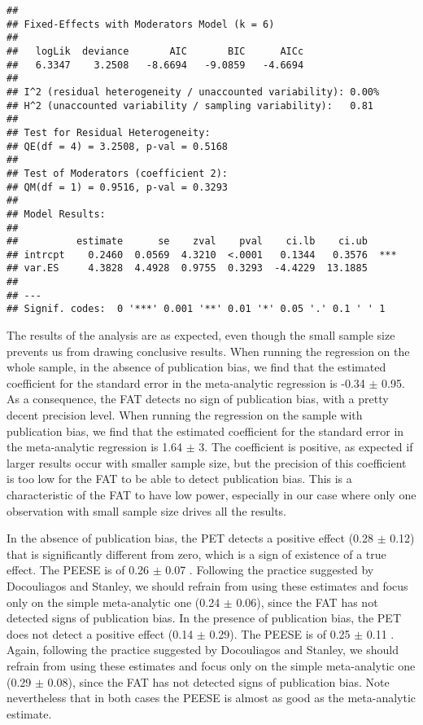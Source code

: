 \documentclass[
]{book}
\theoremstyle{definition}
\theoremstyle{definition}
\theoremstyle{definition}
\theoremstyle{definition}
\theoremstyle{remark}
\begin{document}
\begin{verbatim}
## 
## Fixed-Effects with Moderators Model (k = 6)
## 
##   logLik  deviance       AIC       BIC      AICc 
##   6.3347    3.2508   -8.6694   -9.0859   -4.6694   
## 
## I^2 (residual heterogeneity / unaccounted variability): 0.00%
## H^2 (unaccounted variability / sampling variability):   0.81
## 
## Test for Residual Heterogeneity:
## QE(df = 4) = 3.2508, p-val = 0.5168
## 
## Test of Moderators (coefficient 2):
## QM(df = 1) = 0.9516, p-val = 0.3293
## 
## Model Results:
## 
##          estimate      se    zval    pval    ci.lb    ci.ub 
## intrcpt    0.2460  0.0569  4.3210  <.0001   0.1344   0.3576  *** 
## var.ES     4.3828  4.4928  0.9755  0.3293  -4.4229  13.1885      
## 
## ---
## Signif. codes:  0 '***' 0.001 '**' 0.01 '*' 0.05 '.' 0.1 ' ' 1
\end{verbatim}

The results of the analysis are as expected, even though the small sample size prevents us from drawing conclusive results.
When running the regression on the whole sample, in the absence of publication bias, we find that the estimated coefficient for the standard error in the meta-analytic regression is -0.34 \(\pm\) 0.95.
As a consequence, the FAT detects no sign of publication bias, with a pretty decent precision level.
When running the regression on the sample with publication bias, we find that the estimated coefficient for the standard error in the meta-analytic regression is 1.64 \(\pm\) 3.
The coefficient is positive, as expected if larger results occur with smaller sample size, but the precision of this coefficient is too low for the FAT to be able to detect publication bias.
This is a characteristic of the FAT to have low power, especially in our case where only one observation with small sample size drives all the results.

In the absence of publication bias, the PET detects a positive effect (0.28 \(\pm\) 0.12) that is significantly different from zero, which is a sign of existence of a true effect.
The PEESE is of 0.26 \(\pm\) 0.07 .
Following the practice suggested by Docouliagos and Stanley, we should refrain from using these estimates and focus only on the simple meta-analytic one (0.24 \(\pm\) 0.06), since the FAT has not detected signs of publication bias.
In the presence of publication bias, the PET does not detect a positive effect (0.14 \(\pm\) 0.29).
The PEESE is of 0.25 \(\pm\) 0.11 .
Again, following the practice suggested by Docouliagos and Stanley, we should refrain from using these estimates and focus only on the simple meta-analytic one (0.29 \(\pm\) 0.08), since the FAT has not detected signs of publication bias.
Note nevertheless that in both cases the PEESE is almost as good as the meta-analytic estimate.
\end{document}
